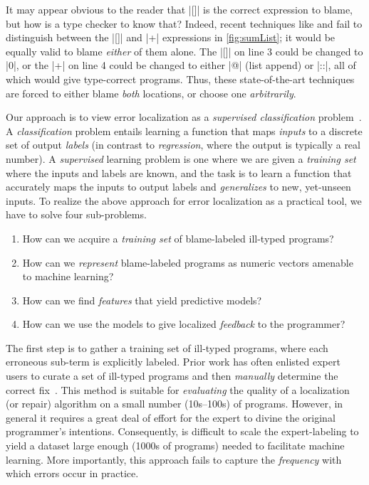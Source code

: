 It may appear obvious to the reader that
|[]| is the correct expression to blame,
but how is a type checker to know that?
%
Indeed, %
recent techniques like
\sherrloc and \mycroft
\citep{Zhang2014-lv,Loncaric2016-uk,Pavlinovic2014-mr}
fail to distinguish between
the |[]| and |+| expressions
in \autoref{fig:sumList};
it would be equally valid
to blame \emph{either}
of them alone.
%
The |[]| on line 3 could be changed to |0|,
or the |+| on line 4 could be changed to
either |@| (list append) or |::|, all of
which would give type-correct programs.
%
Thus, these state-of-the-art techniques
are forced to either blame \emph{both}
locations, or choose one \emph{arbitrarily}.

%
Our approach is to view error localization as a
\emph{supervised classification}
problem~\citep{Kotsiantis2007-pj}.
%
A \emph{classification} problem entails learning
a function that maps \emph{inputs} to a discrete
set of output \emph{labels} (in contrast to %
\emph{regression}, where the output is typically
a real number).
%
A \emph{supervised} learning problem is one where
we are given a \emph{training set} where the
inputs and labels are known, and the task is to
learn a function that accurately maps the inputs
to output labels and \emph{generalizes} to new,
yet-unseen inputs.
%
To realize the above approach for error localization
as a practical tool, we have to solve four sub-problems.
%
\begin{enumerate}
  \item How can we acquire a \emph{training set} of
        blame-labeled ill-typed programs?

  \item How can we \emph{represent} blame-labeled programs
        as numeric vectors amenable to machine learning?

  \item How can we find \emph{features} that yield predictive
        models?

  \item How can we use the models to give localized
        \emph{feedback} to the programmer?
\end{enumerate}


The first step is to gather a training
set of ill-typed programs, where each
erroneous sub-term is explicitly labeled.
%
Prior work has often enlisted
expert users to curate a set of
ill-typed programs and then
\emph{manually} determine the
correct fix~\citep[\eg][]{Lerner2007-dt,Loncaric2016-uk}.
%
This method is suitable for
\emph{evaluating} the quality
of a localization (or repair)
algorithm on a small number
(\eg 10s--100s) of programs.
%
However, in general it requires
a great deal of effort for the
expert to divine the original
programmer's intentions.
%
Consequently, is difficult to
scale the expert-labeling to
yield a dataset large enough
(\eg 1000s of programs) needed
to facilitate machine learning.
%
More importantly, this approach
fails to capture the \emph{frequency}
with which errors occur in practice.

